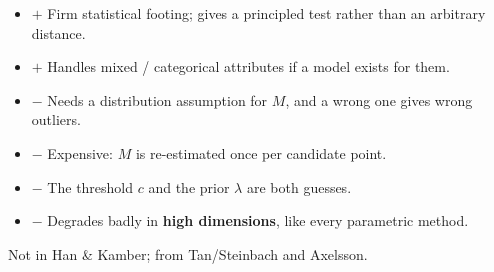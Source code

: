 {
\begin{itemize}
  \item $+$ Firm statistical footing; gives a principled test rather than an arbitrary distance.
  \item $+$ Handles mixed / categorical attributes if a model exists for them.
  \item $-$ Needs a distribution assumption for $M$, and a wrong one gives wrong outliers.
  \item $-$ Expensive: $M$ is re-estimated once per candidate point.
  \item $-$ The threshold $c$ and the prior $\lambda$ are both guesses.
  \item $-$ Degrades badly in \textbf{high dimensions}, like every parametric method.
\end{itemize}}

\hr


{\color{sub}\footnotesize {} \gap
{} Not in Han \& Kamber; from Tan/Steinbach and Axelsson. \added}

